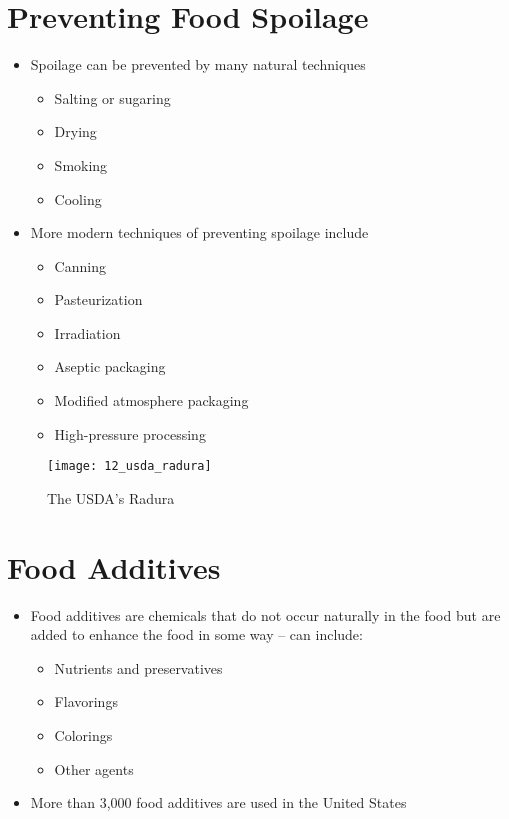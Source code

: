 \documentclass[title={Chapter 12}]{fdsn201notes}
\begin{document}
\section{Preventing Food Spoilage}\label{sec:preventing-food-spoilage}
\begin{itemize}
	\item Spoilage can be prevented by many natural techniques
	\begin{itemize}
		\item Salting or sugaring
		\item Drying
		\item Smoking
		\item Cooling
	\end{itemize}
	\item More modern techniques of preventing spoilage include
	\begin{itemize}
		\item Canning
		\item Pasteurization
		\item Irradiation
		\item Aseptic packaging
		\item Modified atmosphere packaging
		\item High-pressure processing
	\end{itemize}
\end{itemize}

\begin{figure}[H]
	\centering
	\texttt{[image: 12\_usda\_radura]}
	\caption{The USDA’s Radura}
	\label{fig:12-usda-radura}
\end{figure}

\section{Food Additives}\label{sec:food-additives}
\begin{itemize}
	\item Food additives are chemicals that do not occur naturally in the food but are added to enhance the food in some way – can include:
	\begin{itemize}
		\item Nutrients and preservatives
		\item Flavorings
		\item Colorings
		\item Other agents
	\end{itemize}
	\item More than 3,000 food additives are used in the United States
\end{itemize}
\end{document}
